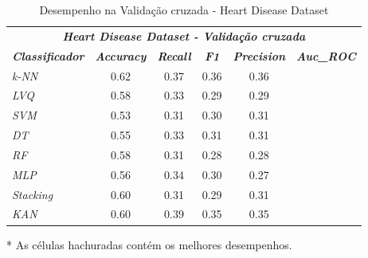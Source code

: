 \documentclass[journal]{IEEEtran}
\begin{document}
\begin{table}[h!]
	\caption{Desempenho na Validação cruzada - Heart Disease Dataset}
	\label{tab:15}
	\begin{threeparttable}
		\begin{tabular}{lccccc}
			\hline
			\multicolumn{6}{c}{\textit{\textbf{Heart Disease Dataset - Validação cruzada}}}                                                                                                                      \\
			\multicolumn{1}{l|}{\textit{\textbf{Classificador}}} & \textit{\textbf{Accuracy}} & \textit{\textbf{Recall}}  & \textit{\textbf{F1}}      & \textit{\textbf{Precision}} & \textit{\textbf{Auc\_ROC}} \\ \hline
			\multicolumn{1}{l|}{\textit{k-NN}}                   & \cellcolor{lightgray}0.62  & 0.37                      & \cellcolor{lightgray}0.36 & \cellcolor{lightgray}0.36   &                            \\
			\multicolumn{1}{l|}{\textit{LVQ}}                    & 0.58                       & 0.33                      & 0.29                      & 0.29                        &                            \\
			\multicolumn{1}{l|}{\textit{SVM}}                    & 0.53                       & 0.31                      & 0.30                      & 0.31                        &                            \\
			\multicolumn{1}{l|}{\textit{DT}}                     & 0.55                       & 0.33                      & 0.31                      & 0.31                        &                            \\
			\multicolumn{1}{l|}{\textit{RF}}                     & 0.58                       & 0.31                      & 0.28                      & 0.28                        &                            \\
			\multicolumn{1}{l|}{\textit{MLP}}                    & 0.56                       & 0.34                      & 0.30                      & 0.27                        &                            \\
			\multicolumn{1}{l|}{\textit{Stacking}}               & 0.60                       & 0.31                      & 0.29                      & 0.31                        &                            \\
			\multicolumn{1}{l|}{\textit{KAN}}                    & 0.60                       & \cellcolor{lightgray}0.39 & 0.35                      & 0.35                        &                            \\
			\hline
		\end{tabular}
		\begin{tablenotes}\footnotesize
			\item[*] As células hachuradas contém os melhores desempenhos.
		\end{tablenotes}
	\end{threeparttable}
\end{table}
\end{document}
